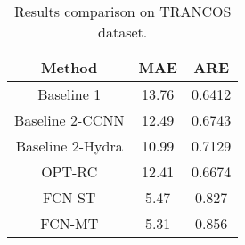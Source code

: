 \documentclass[twocolumn]{article}
\begin{document}
\begin{table}[h]
	\centering
	\caption{Results comparison on TRANCOS dataset.}\label{TRANCOS}
	\begin{tabular}{|c|c|c|}
		\hline
		Method & MAE & ARE \\
		\hline
		Baseline 1 &13.76&0.6412\\
		\hline
		Baseline 2-CCNN&12.49&0.6743\\
		\hline
	    Baseline 2-Hydra&10.99&0.7129\\
		\hline
		OPT-RC&12.41&0.6674\\
		\hline
		FCN-ST&5.47&0.827\\
		\hline
	    FCN-MT&5.31&0.856\\
		\hline
	\end{tabular}
\end{table}
	

\end{document}
